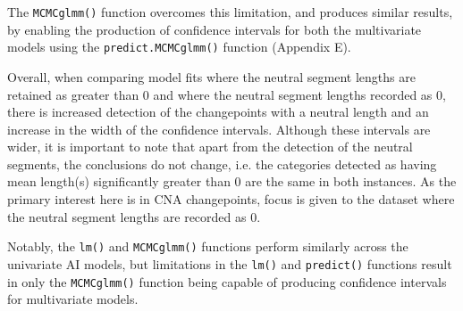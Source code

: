 The \texttt{MCMCglmm()} function overcomes this limitation, and produces similar results, by enabling the production of confidence intervals for both the multivariate models using the \texttt{predict.MCMCglmm()} function (Appendix E). 

Overall, when comparing model fits where the neutral segment lengths are retained as greater than 0 and where the neutral segment lengths recorded as 0, there is increased detection of the changepoints with a neutral length and an increase in the width of the confidence intervals. Although these intervals are wider, it is important to note that apart from the detection of the neutral segments, the conclusions do not change, i.e. the categories detected as having mean length(s) significantly greater than 0 are the same in both instances. As the primary interest here is in CNA changepoints, focus is given to the dataset where the neutral segment lengths are recorded as 0.  

Notably, the \texttt{lm()} and \texttt{MCMCglmm()} functions perform similarly across the univariate AI models, but limitations in the \texttt{lm()} and \texttt{predict()} functions result in only the \texttt{MCMCglmm()} function being capable of producing confidence intervals for multivariate models.

